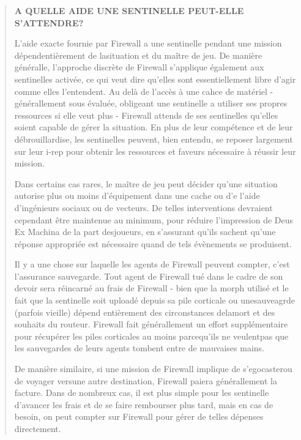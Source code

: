 \begin{quotation} \begin{large} \textbf{A QUELLE AIDE UNE SENTINELLE PEUT-ELLE S'ATTENDRE?} \end{large} 

L'aide exacte fournie par Firewall a une sentinelle pendant une mission dépendentièrement de lasituation et du maître de jeu. De manière généralle, l'approche discrète de Firewall s'applique également aux sentinelles activée, ce qui veut dire qu'elles sont essentiellement libre d'agir comme elles l'entendent. Au delà de l'accès à une cahce de matériel - générallement sous évaluée, obligeant une sentinelle a utiliser ses propres ressources si elle veut plus - Firewall attends de ses sentinelles qu'elles soient capable de gérer la situation. En plus de leur compétence et de leur débrouillardise, les sentinelles peuvent, bien entendu, se reposer largement sur leur i-rep pour obtenir les ressources et faveurs nécessaire à réussir leur mission. 

Dans certains cas rares, le maître de jeu peut décider qu'une situation autorise plus ou moins d'équipement dans une cache ou d'e l'aide d'ingénieurs sociaux ou de vecteurs. De telles interventions devraient cependant être maintenue au minimum, pour réduire l'impression de Deus Ex Machina de la part desjoueurs, en s'assurant qu'ils sachent qu'une réponse appropriée est nécessaire quand de tels évènements se produisent. 

Il y a une chose sur laquelle les agents de Firewall peuvent compter, c'est l'assurance sauvegarde. Tout agent de Firewall tué dans le cadre de son devoir sera réincarné au frais de Firewall - bien que la morph utilisé et le fait que la sentinelle soit uploadé depuis sa pile corticale ou unesauveagrde (parfois vieille) dépend entièrement des circonstances delamort et des souhaits du routeur. Firewall fait générallement un effort supplémentaire pour récupérer les piles corticales au moins parcequ'ils ne veulentpas que les sauvegardes de leurs agents tombent entre de mauvaises mains. 

De manière similaire, si une mission de Firewall implique de s'egocasterou de voyager versune autre destination, Firewall paiera générallement la facture. Dans de nombreux cas, il est plus simple pour les sentinelle d'avancer les frais et de se faire rembourser plus tard, mais en cas de besoin, on peut compter sur Firewall pour gérer de telles dépenses directement. \end{quotation} 

